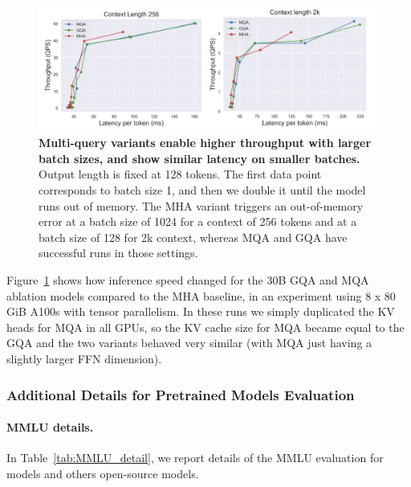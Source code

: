 \begin{figure}
    \centering
    \includegraphics[width=1.0 \linewidth]{img/llama-mq-combined.png}
    \caption{\textbf{Multi-query variants enable higher throughput with larger batch sizes, and show similar latency on smaller batches.} Output length is fixed at 128 tokens. The first data point corresponds to batch size 1, and then we double it until the model runs out of memory. The MHA variant triggers an out-of-memory error at a batch size of 1024 for a context of 256 tokens and at a batch size of 128 for 2k context, whereas MQA and GQA have successful runs in those settings.}
    \label{fig:inference_mq} 
\end{figure}

Figure~\ref{fig:inference_mq} shows how inference speed changed for the 30B GQA and MQA ablation models compared to the MHA baseline, in an experiment using 8 x 80 GiB A100s with tensor parallelism. In these runs we simply duplicated the KV heads for MQA in all GPUs, so the KV cache size for MQA became equal to the GQA and the two variants behaved very similar (with MQA just having a slightly larger FFN dimension).


\subsubsection{Additional Details for Pretrained Models Evaluation}
\label{app:pretrained_model_evals}
\paragraph{MMLU details.} In Table~\ref{tab:MMLU_detail}, we report details of the MMLU \citep{Hendrycks2020MeasuringMM} evaluation for \cinnamon models and others open-source models.

